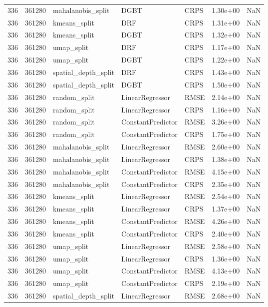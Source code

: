\begin{tabular}{rrlllrr}
336 & 361280 & mahalanobis\_split & DGBT & CRPS & 1.30e+00 & NaN \\
336 & 361280 & kmeans\_split & DRF & CRPS & 1.31e+00 & NaN \\
336 & 361280 & kmeans\_split & DGBT & CRPS & 1.32e+00 & NaN \\
336 & 361280 & umap\_split & DRF & CRPS & 1.17e+00 & NaN \\
336 & 361280 & umap\_split & DGBT & CRPS & 1.22e+00 & NaN \\
336 & 361280 & spatial\_depth\_split & DRF & CRPS & 1.43e+00 & NaN \\
336 & 361280 & spatial\_depth\_split & DGBT & CRPS & 1.50e+00 & NaN \\
336 & 361280 & random\_split & LinearRegressor & RMSE & 2.14e+00 & NaN \\
336 & 361280 & random\_split & LinearRegressor & CRPS & 1.16e+00 & NaN \\
336 & 361280 & random\_split & ConstantPredictor & RMSE & 3.26e+00 & NaN \\
336 & 361280 & random\_split & ConstantPredictor & CRPS & 1.75e+00 & NaN \\
336 & 361280 & mahalanobis\_split & LinearRegressor & RMSE & 2.60e+00 & NaN \\
336 & 361280 & mahalanobis\_split & LinearRegressor & CRPS & 1.38e+00 & NaN \\
336 & 361280 & mahalanobis\_split & ConstantPredictor & RMSE & 4.15e+00 & NaN \\
336 & 361280 & mahalanobis\_split & ConstantPredictor & CRPS & 2.35e+00 & NaN \\
336 & 361280 & kmeans\_split & LinearRegressor & RMSE & 2.54e+00 & NaN \\
336 & 361280 & kmeans\_split & LinearRegressor & CRPS & 1.37e+00 & NaN \\
336 & 361280 & kmeans\_split & ConstantPredictor & RMSE & 4.26e+00 & NaN \\
336 & 361280 & kmeans\_split & ConstantPredictor & CRPS & 2.40e+00 & NaN \\
336 & 361280 & umap\_split & LinearRegressor & RMSE & 2.58e+00 & NaN \\
336 & 361280 & umap\_split & LinearRegressor & CRPS & 1.36e+00 & NaN \\
336 & 361280 & umap\_split & ConstantPredictor & RMSE & 4.13e+00 & NaN \\
336 & 361280 & umap\_split & ConstantPredictor & CRPS & 2.19e+00 & NaN \\
336 & 361280 & spatial\_depth\_split & LinearRegressor & RMSE & 2.68e+00 & NaN \\

\end{tabular}
